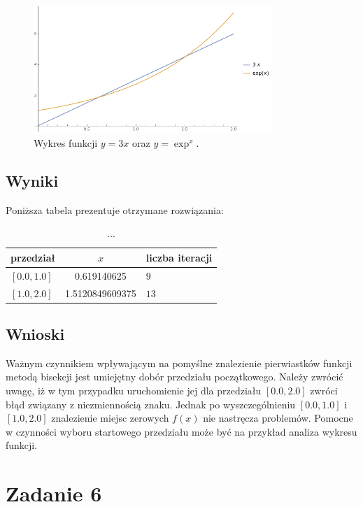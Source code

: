 \documentclass{classrep}
\begin{document}
		\begin{figure}[!htbp]
			\centering
			\includegraphics[width=0.8\textwidth]{zadania/plot51.png}
  			\caption{Wykres funkcji $y=3x$ oraz $y=\exp^x$.}
  			\label{fig:1}
		\end{figure}	
		
	\subsection{Wyniki}
		Poniższa tabela prezentuje otrzymane rozwiązania:
		\begin{table}[!hpbt]
        		\centering
        		\footnotesize
			\begin{tabular}{lSl} \toprule
				{przedział} & {$x$} & {liczba iteracji}\\ \midrule
				$[0.0,1.0]$ & 0.619140625 & $9$ \\ 
	 			$[1.0,2.0]$ & 1.5120849609375 & $13$ \\ \bottomrule
	 		\end{tabular}
	 		\caption{...}
			\label{table:2}
		\end{table}	
		
	\subsection{Wnioski}
		Ważnym czynnikiem wpływającym na pomyślne znalezienie pierwiastków funkcji metodą bisekcji jest umiejętny dobór przedziału początkowego. Należy zwrócić uwagę, iż w tym przypadku uruchomienie jej dla przedziału $[0.0,2.0]$ zwróci błąd związany z niezmiennością znaku. Jednak po wyszczególnieniu $[0.0,1.0]$ i $[1.0,2.0]$ znalezienie miejsc zerowych $f(x)$ nie nastręcza problemów. Pomocne w czynności wyboru startowego przedziału może być na przykład analiza wykresu funkcji.
		
\section{Zadanie 6}
\end{document}
